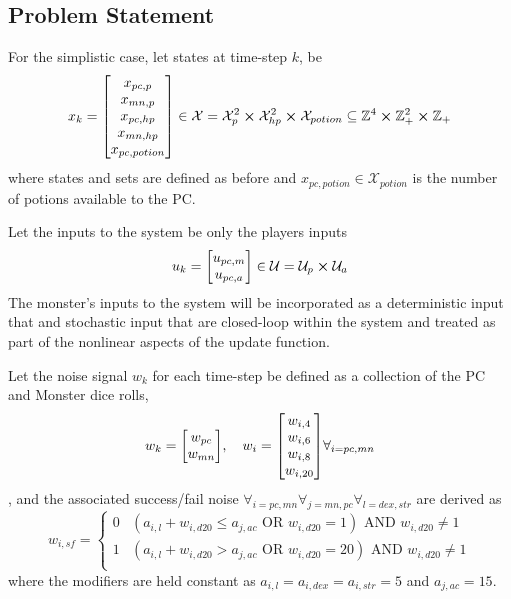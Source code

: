 \documentclass[9pt, onecolumn]{report}
\newcommand{\Z}{\mathbb{Z}}
\begin{document}
\subsection{Problem Statement}
For the simplistic case, let states at time-step $k$, be \[
    x_k = \mqty[x_{pc,p}\\x_{mn,p}\\x_{pc,hp}\\x_{mn,hp}\\ x_{pc,potion}] 
    \in \mathcal{X} = \mathcal{X}_p^2 \cross \mathcal{X}_{hp}^2 \cross \mathcal{X}_{potion}
    \subseteq \Z^{4} \cross \Z_{+}^{2} \cross \Z_{+}
\] where states and sets are defined as before and $x_{pc,potion} \in \mathcal{X}_{potion}$ is the number of potions available to the PC.

Let the inputs to the system be only the players inputs \[
    u_k = \mqty[u_{pc,m}\\u_{pc,a}] \in \mathcal{U} = \mathcal{U}_{p} \cross \mathcal{U}_{a} %
\] The monster's inputs to the system will be incorporated as a deterministic input that and stochastic input that are closed-loop within the system and treated as part of the nonlinear aspects of the update function.

Let the noise signal $w_k$ for each time-step be defined as a collection of the PC and Monster dice rolls, \[
    w_k = \mqty[w_{pc} \\ w_{mn}], \quad w_{i} = \mqty[w_{i,4} \\ w_{i,6} \\ w_{i,8} \\ w_{i,20}] \forall_{i = pc,mn}
\], and the associated success/fail noise $\forall_{i=pc,mn} \forall_{j=mn,pc} \forall_{l = dex,str}$ are derived as \[
    w_{i,sf} = \begin{cases}
        0 & (a_{i,l} + w_{i,d20} \leq a_{j,ac} \text{ OR } w_{i,d20} = 1) \text{ AND } w_{i,d20} \neq 1\\
        1 & (a_{i,l} + w_{i,d20} > a_{j,ac} \text{ OR } w_{i,d20} = 20) \text{ AND } w_{i,d20} \neq 1\\
    \end{cases}
\] where the modifiers are held constant as $a_{i,l} = a_{i,dex} = a_{i,str} = 5$ and $a_{j,ac} = 15$.
\end{document}
